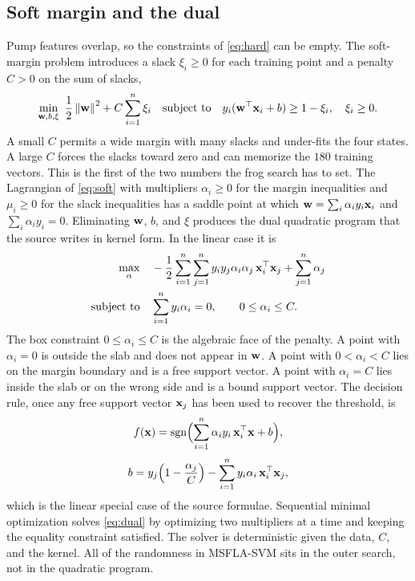 \subsection{Soft margin and the dual}

Pump features overlap, so the constraints of \eqref{eq:hard} can be empty.
The soft-margin problem introduces a slack \(\xi_{i}\ge 0\) for each training point and a penalty \(C>0\) on the sum of slacks,
\begin{equation}
\min_{\vect{w}, b, \xi}\ 
\frac{1}{2}\norm{\vect{w}}^{2}+C\sum_{i=1}^{n}\xi_{i}
\quad\text{subject to}\quad
y_{i}(\vect{w}^{\top}\vect{x}_{i}+b)\ge 1-\xi_{i},\quad \xi_{i}\ge 0.
\label{eq:soft}
\end{equation}
A small \(C\) permits a wide margin with many slacks and under-fits the four states.
A large \(C\) forces the slacks toward zero and can memorize the \(180\) training vectors.
This is the first of the two numbers the frog search has to set.
The Lagrangian of \eqref{eq:soft} with multipliers \(\alpha_{i}\ge 0\) for the margin inequalities and \(\mu_{i}\ge 0\) for the slack inequalities has a saddle point at which \(\mathbf{w}=\sum_{i}\alpha_{i} y_{i}\mathbf{x}_{i}\) and \(\sum_{i}\alpha_{i} y_{i}=0\).
Eliminating \(\mathbf{w}\), \(b\), and \(\xi\) produces the dual quadratic program that the source writes in kernel form.
In the linear case it is
\begin{equation}
\begin{aligned}
\max_{\alpha}\quad
&-\frac{1}{2}\sum_{i=1}^{n}\sum_{j=1}^{n} y_{i} y_{j}\alpha_{i}\alpha_{j}\,\mathbf{x}_{i}^{\top}\mathbf{x}_{j}
+\sum_{j=1}^{n}\alpha_{j}\\
\text{subject to}\quad
&\sum_{i=1}^{n} y_{i}\alpha_{i}=0,
\qquad 0\le \alpha_{i}\le C.
\end{aligned}
\label{eq:dual}
\end{equation}
The box constraint \(0\le\alpha_{i}\le C\) is the algebraic face of the penalty.
A point with \(\alpha_{i}=0\) is outside the slab and does not appear in \(\mathbf{w}\).
A point with \(0<\alpha_{i}<C\) lies on the margin boundary and is a free support vector.
A point with \(\alpha_{i}=C\) lies inside the slab or on the wrong side and is a bound support vector.
The decision rule, once any free support vector \(\mathbf{x}_{j}\) has been used to recover the threshold, is
\begin{equation}
f(\mathbf{x})=\operatorname{sgn}\Bigl(\sum_{i=1}^{n}\alpha_{i} y_{i}\,\mathbf{x}_{i}^{\top}\mathbf{x}+b\Bigr),
\label{eq:declin}
\end{equation}
\begin{equation}
b=y_{j}\Bigl(1-\frac{\alpha_{j}}{C}\Bigr)-\sum_{i=1}^{n} y_{i}\alpha_{i}\,\mathbf{x}_{i}^{\top}\mathbf{x}_{j},
\label{eq:bias}
\end{equation}
which is the linear special case of the source formulae.
Sequential minimal optimization solves \eqref{eq:dual} by optimizing two multipliers at a time and keeping the equality constraint satisfied.
The solver is deterministic given the data, \(C\), and the kernel.
All of the randomness in MSFLA-SVM sits in the outer search, not in the quadratic program.

